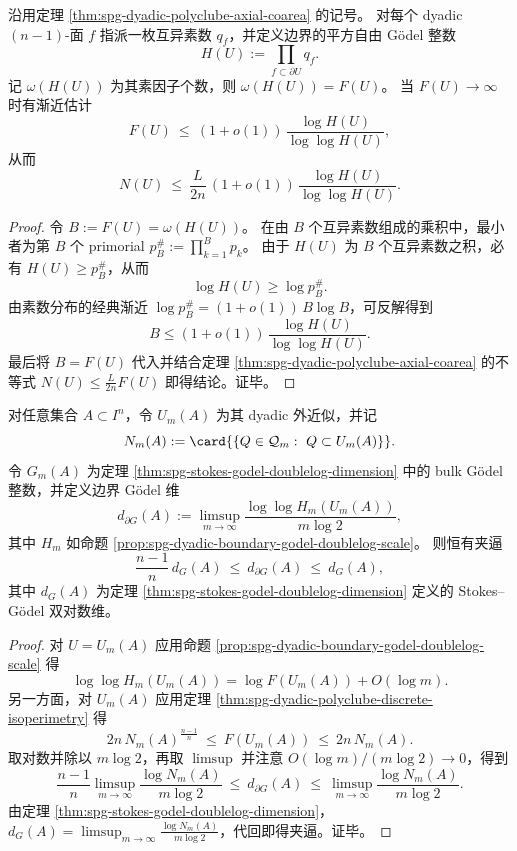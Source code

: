 \begin{corollary}\label{cor:spg-dyadic-boundary-godel-volume-upperbound}
沿用定理 \ref{thm:spg-dyadic-polyclube-axial-coarea} 的记号。
对每个 dyadic \((n-1)\)-面 \(f\) 指派一枚互异素数 \(q_f\)，并定义边界的平方自由 Gödel 整数
\[
H(U):=\prod_{f\subset \partial U} q_f.
\]
记 \(\omega(H(U))\) 为其素因子个数，则 \(\omega(H(U))=F(U)\)。
当 \(F(U)\to\infty\) 时有渐近估计
\[
F(U)\ \le\ (1+o(1))\,\frac{\log H(U)}{\log\log H(U)},
\]
从而
\[
N(U)\ \le\ \frac{L}{2n}\,(1+o(1))\,\frac{\log H(U)}{\log\log H(U)}.
\]
\end{corollary}
\begin{proof}
令 \(B:=F(U)=\omega(H(U))\)。
在由 \(B\) 个互异素数组成的乘积中，最小者为第 \(B\) 个 primorial
\(
p_B^\#:=\prod_{k=1}^{B}p_k
\)。
由于 \(H(U)\) 为 \(B\) 个互异素数之积，必有 \(H(U)\ge p_B^\#\)，从而
\[
\log H(U)\ge \log p_B^\#.
\]
由素数分布的经典渐近 \(\log p_B^\#=(1+o(1))\,B\log B\)，可反解得到
\[
B\le (1+o(1))\,\frac{\log H(U)}{\log\log H(U)}.
\]
最后将 \(B=F(U)\) 代入并结合定理 \ref{thm:spg-dyadic-polyclube-axial-coarea} 的不等式 \(N(U)\le \frac{L}{2n}F(U)\) 即得结论。证毕。
\end{proof}

\begin{theorem}\label{thm:spg-bulk-boundary-godel-dimension-sandwich}
对任意集合 \(A\subset I^n\)，令 \(U_m(A)\) 为其 dyadic 外近似，并记
\[
N_m(A):=\card{\{Q\in\mathcal Q_m:\ Q\subset U_m(A)\}}.
\]
令 \(G_m(A)\) 为定理 \ref{thm:spg-stokes-godel-doublelog-dimension} 中的 bulk Gödel 整数，并定义边界 Gödel 维
\[
d_{\partial G}(A):=\limsup_{m\to\infty}\frac{\log\log H_m(U_m(A))}{m\log 2},
\]
其中 \(H_m\) 如命题 \ref{prop:spg-dyadic-boundary-godel-doublelog-scale}。
则恒有夹逼
\[
\frac{n-1}{n}\,d_G(A)\ \le\ d_{\partial G}(A)\ \le\ d_G(A),
\]
其中 \(d_G(A)\) 为定理 \ref{thm:spg-stokes-godel-doublelog-dimension} 定义的 Stokes--Gödel 双对数维。
\end{theorem}
\begin{proof}
对 \(U=U_m(A)\) 应用命题 \ref{prop:spg-dyadic-boundary-godel-doublelog-scale} 得
\[
\log\log H_m(U_m(A))=\log F(U_m(A))+O(\log m).
\]
另一方面，对 \(U_m(A)\) 应用定理 \ref{thm:spg-dyadic-polyclube-discrete-isoperimetry} 得
\[
2n\,N_m(A)^{\frac{n-1}{n}}\ \le\ F(U_m(A))\ \le\ 2n\,N_m(A).
\]
取对数并除以 \(m\log 2\)，再取 \(\limsup\) 并注意 \(O(\log m)/(m\log 2)\to 0\)，得到
\[
\frac{n-1}{n}\limsup_{m\to\infty}\frac{\log N_m(A)}{m\log 2}
\ \le\ d_{\partial G}(A)\ \le\
\limsup_{m\to\infty}\frac{\log N_m(A)}{m\log 2}.
\]
由定理 \ref{thm:spg-stokes-godel-doublelog-dimension}，\(d_G(A)=\limsup_{m\to\infty}\frac{\log N_m(A)}{m\log 2}\)，代回即得夹逼。证毕。
\end{proof}

